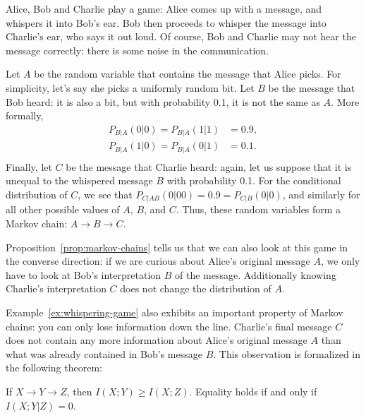 \begin{example}\label{ex:whispering-game}
Alice, Bob and Charlie play a game: Alice comes up with a message, and whispers it into Bob's ear. Bob then proceeds to whisper the message into Charlie's ear, who says it out loud. Of course, Bob and Charlie may not hear the message correctly: there is some noise in the communication.

Let $A$ be the random variable that contains the message that Alice picks. For simplicity, let's say she picks a uniformly random bit. Let $B$ be the message that Bob heard: it is also a bit, but with probability 0.1, it is not the same as $A$. More formally,
\begin{align*}
P_{B|A}(0|0) = P_{B|A}(1|1) &= 0.9,\\
P_{B|A}(1|0) = P_{B|A}(0|1) &= 0.1.\\
\end{align*}
Finally, let $C$ be the message that Charlie heard: again, let us suppose that it is unequal to the whispered message $B$ with probability 0.1. For the conditional distribution of $C$, we see that $P_{C|AB}(0|00) = 0.9 = P_{C|B}(0|0)$, and similarly for all other possible values of $A$, $B$, and $C$. Thus, these random variables form a Markov chain: $A \to B \to C$.

Proposition~\ref{prop:markov-chains} tells us that we can also look at this game in the converse direction: if we are curious about Alice's original message $A$, we only have to look at Bob's interpretation $B$ of the message. Additionally knowing Charlie's interpretation $C$ does not change the distribution of $A$.
\end{example}
Example~\ref{ex:whispering-game} also exhibits an important property of Markov chains: you can only lose information down the line. Charlie's final message $C$ does not contain any more information about Alice's original message $A$ than what was already contained in Bob's message $B$. This observation is formalized in the following theorem:
\begin{theorem}\label{thm:data-processing-inequality}
If $X \to Y \to Z$, then $I(X;Y) \geq I(X;Z)$. Equality holds if and only if $I(X;Y|Z) = 0$.
\end{theorem}

